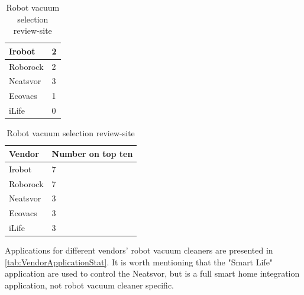 \begin{table}[H]
\begin{subtable}[b]{0.45\linewidth}
\begin{tabular}{|l|l|}
            Irobot      & 2                 \\                   \hline
            Roborock    & 2                 \\                   \hline
            Neatsvor    & 3                 \\                   \hline
            Ecovacs     & 1                 \\                   \hline
            iLife       & 0                 \\                   \hline
        \end{tabular}
    \end{subtable}
    \hspace{0.5cm}
    \begin{subtable}[b]{0.45\linewidth}
        \centering
        \caption{Summary of all review-sites}
        \begin{tabular}{|l|l|}
            \hline
            \textbf{Vendor}    & \textbf{Number on top ten} \\ \hline
            Irobot      & 7                 \\                   \hline
            Roborock    & 7                 \\                   \hline
            Neatsvor    & 3                 \\                   \hline
            Ecovacs     & 3                 \\                   \hline
            iLife       & 3                 \\                   \hline
        \end{tabular}
    \end{subtable}
    \caption{Robot vacuum selection review-site}
\end{table}

Applications for different vendors' robot vacuum cleaners are presented in \ref{tab:VendorApplicationStat}. It is worth mentioning that the "Smart Life" application are used to control the Neatsvor, but is a full smart home integration application, not robot vacuum cleaner specific. 


